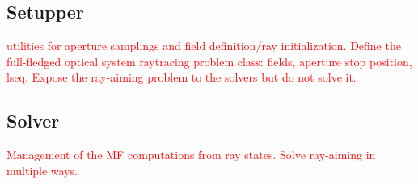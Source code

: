 \subsection{Setupper}
\textcolor{red}{utilities for aperture samplings and field definition/ray
initialization. Define the full-fledged optical system raytracing problem
class: fields, aperture stop position, lseq. Expose the ray-aiming problem
to the solvers but do not solve it.}

\subsection{Solver}
\textcolor{red}{Management of the MF computations from ray states. Solve
ray-aiming in multiple ways.}
